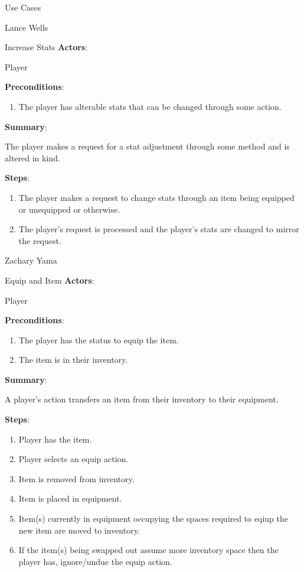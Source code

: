 \documentclass[12pt]{report}
\begin{document}
\begin{section}{Use Cases}
\begin{subsection}{Lance Wells}
\begin{subsubsection}{Increase Stats}
\textbf{Actors}:

Player

\textbf{Preconditions}:

\begin{enumerate}
\item The player has alterable stats that can be changed through some
action.
\end{enumerate}

\textbf{Summary}:

The player makes a request for a stat adjustment through some
method and is altered in kind.

\textbf{Steps}:

\begin{enumerate}
\item The player makes a request to change stats through an item being
equipped or unequipped or otherwise.
\item The player's request is processed and the player's stats are changed
to mirror the request.
\end{enumerate}
\end{subsubsection}
\end{subsection}

\begin{subsection}{Zachary Yama}
\begin{subsubsection}{Equip and Item}
\textbf{Actors}:

Player

\textbf{Preconditions}:
 
\begin{enumerate}
\item The player has the status to equip the item. 
\item The item is in their inventory.
\end{enumerate}

\textbf{Summary}:

A player's action transfers an item from their inventory to their
equipment.

\textbf{Steps}:

\begin{enumerate}
\item Player has the item.
\item Player selects an equip action.
\item Item is removed from inventory.
\item Item is placed in equipment.
\item Item(s) currently in equipment occupying the spaces required to eqiup
the new item are moved to inventory.
\item If the item(s) being swapped out assume more inventory space then the
player has, ignore/undue the equip action.
\end{enumerate}
\end{subsubsection}


\end{subsection}
\end{section}
\end{document}
